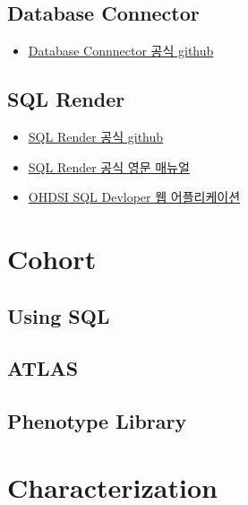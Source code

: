 \documentclass[]{book}
\providecommand{\tightlist}{%
  \setlength{\itemsep}{0pt}\setlength{\parskip}{0pt}}
\begin{document}
\hypertarget{database-connector}{%
\section{Database Connector}\label{database-connector}}

\begin{itemize}
\tightlist
\item
  \href{https://github.com/ohdsi/databaseconnector}{Database Connnector 공식 github}
\end{itemize}

\hypertarget{sql-render}{%
\section{SQL Render}\label{sql-render}}

\begin{itemize}
\tightlist
\item
  \href{https://github.com/ohdsi/sqlrender}{SQL Render 공식 github}
\item
  \href{https://ohdsi.github.io/SqlRender/reference/index.html}{SQL Render 공식 영문 매뉴얼}
\item
  \href{http://data.ohdsi.org/SqlDeveloper/}{OHDSI SQL Devloper 웹 어플리케이션}
\end{itemize}

\hypertarget{cohort}{%
\chapter{Cohort}\label{cohort}}

\hypertarget{using-sql}{%
\section{Using SQL}\label{using-sql}}

\hypertarget{atlas}{%
\section{ATLAS}\label{atlas}}

\hypertarget{phenotype-library}{%
\section{Phenotype Library}\label{phenotype-library}}

\hypertarget{characterization}{%
\chapter{Characterization}\label{characterization}}
\end{document}
